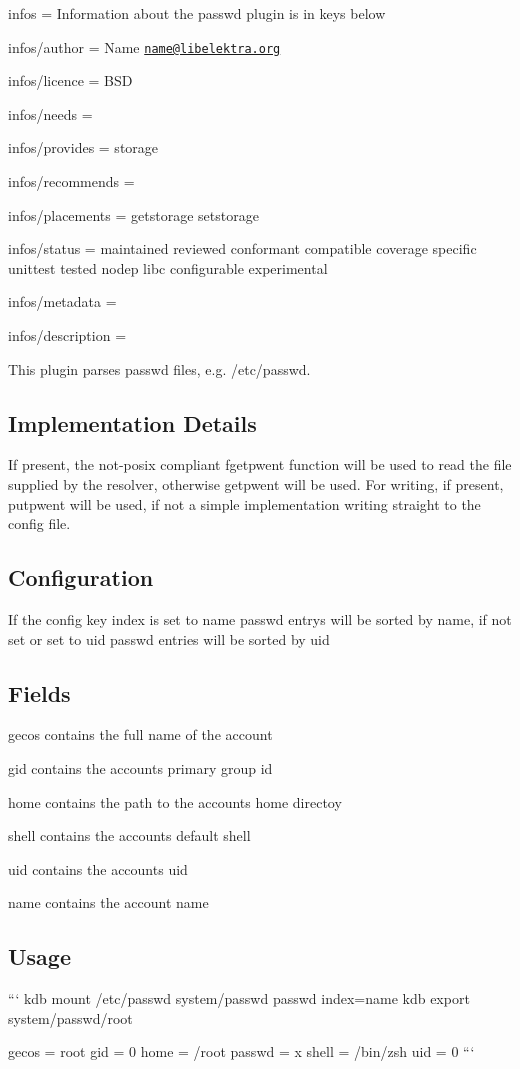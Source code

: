 
\begin{DoxyItemize}
\item infos = Information about the passwd plugin is in keys below
\item infos/author = Name \href{mailto:name@libelektra.org}{\tt name@libelektra.\+org}
\item infos/licence = B\+S\+D
\item infos/needs =
\item infos/provides = storage
\item infos/recommends =
\item infos/placements = getstorage setstorage
\item infos/status = maintained reviewed conformant compatible coverage specific unittest tested nodep libc configurable experimental
\item infos/metadata =
\item infos/description =
\end{DoxyItemize}

This plugin parses {\ttfamily passwd} files, e.\+g. {\ttfamily /etc/passwd}.

\subsection*{Implementation Details}

If present, the not-\/posix compliant {\ttfamily fgetpwent} function will be used to read the file supplied by the resolver, otherwise {\ttfamily getpwent} will be used. For writing, if present, {\ttfamily putpwent} will be used, if not a simple implementation writing straight to the config file.

\subsection*{Configuration}

If the config key {\ttfamily index} is set to {\ttfamily name} passwd entrys will be sorted by name, if not set or set to {\ttfamily uid} passwd entries will be sorted by uid

\subsection*{Fields}


\begin{DoxyItemize}
\item {\ttfamily gecos} contains the full name of the account
\item {\ttfamily gid} contains the accounts primary group id
\item {\ttfamily home} contains the path to the accounts home directoy
\item {\ttfamily shell} contains the accounts default shell
\item {\ttfamily uid} contains the accounts uid
\item {\ttfamily name} contains the account name
\end{DoxyItemize}

\subsection*{Usage}

``` kdb mount /etc/passwd system/passwd passwd index=name kdb export system/passwd/root

gecos = root gid = 0 home = /root passwd = x shell = /bin/zsh uid = 0 ``` 